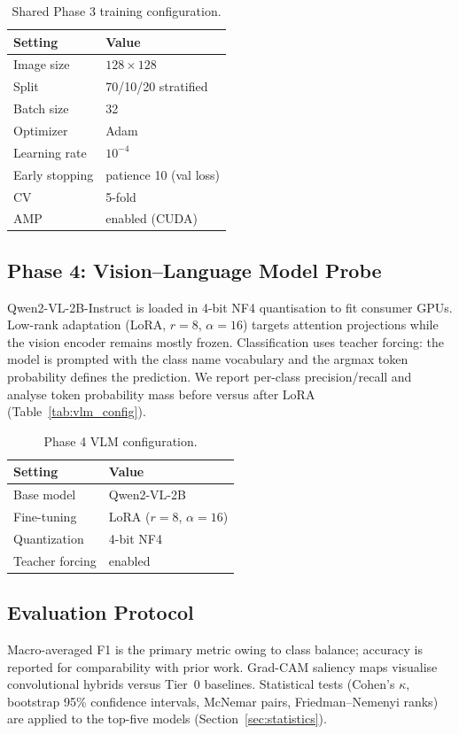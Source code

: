 \documentclass[11pt]{article}
\begin{document}
\begin{table}
\centering
\caption{Shared Phase 3 training configuration.}

\begin{tabular}{@{}ll@{}}
\hline
Setting & Value \\
\hline
Image size & $128\times128$ \\
Split & 70/10/20 stratified \\
Batch size & 32 \\
Optimizer & Adam \\
Learning rate & $10^{-4}$ \\
Early stopping & patience 10 (val loss) \\
CV & 5-fold \\
AMP & enabled (CUDA) \\
\hline
\end{tabular}
\end{table}


\subsection{Phase 4: Vision--Language Model Probe}

Qwen2-VL-2B-Instruct is loaded in 4-bit NF4 quantisation to fit consumer GPUs.
Low-rank adaptation (LoRA, $r=8$, $\alpha=16$) targets attention projections while the vision encoder remains mostly frozen.
Classification uses teacher forcing: the model is prompted with the class name vocabulary and the argmax token probability defines the prediction.
We report per-class precision/recall and analyse token probability mass before versus after LoRA (Table~\ref{tab:vlm_config}).

\begin{table}
\centering
\caption{Phase 4 VLM configuration.}

\begin{tabular}{@{}ll@{}}
\hline
Setting & Value \\
\hline
Base model & Qwen2-VL-2B \\
Fine-tuning & LoRA ($r=8$, $\alpha=16$) \\
Quantization & 4-bit NF4 \\
Teacher forcing & enabled \\
\hline
\end{tabular}
\end{table}


\subsection{Evaluation Protocol}
Macro-averaged F1 is the primary metric owing to class balance; accuracy is reported for comparability with prior work.
Grad-CAM saliency maps visualise convolutional hybrids versus Tier~0 baselines.
Statistical tests (Cohen's $\kappa$, bootstrap 95\% confidence intervals, McNemar pairs, Friedman--Nemenyi ranks) are applied to the top-five models (Section~\ref{sec:statistics}).
\end{document}
